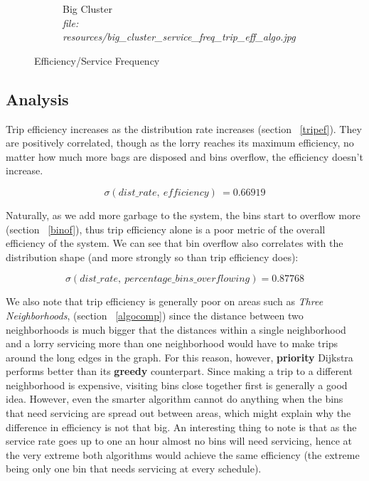 \documentclass{article}
\begin{document}
\begin{figure}[H]
\begin{subfigure}[b]{.5\textwidth}
				\caption{Big Cluster\\\textit{file: resources/big\_cluster\_service\_freq\_trip\_eff\_algo.jpg}}
				\label{fig:fig9b}
			\end{subfigure}
			\label{fig:fig9}
			\caption{Efficiency/Service Frequency}
		\end{figure}

		\subsection{Analysis}
		Trip efficiency increases as the distribution rate increases (section ~\ref{tripef}). They are positively correlated, though
		as the lorry reaches its maximum efficiency, no matter how much more bags are disposed and bins overflow,
		the efficiency doesn't increase.
		
		\begin{equation}
			\sigma(dist\_rate,\ efficiency)\ = 0.66919
		\end{equation} 

		Naturally, as we add more garbage to the system, the bins start to overflow more (section ~\ref{binof}), thus trip efficiency alone
		is a poor metric of the overall efficiency of the system. We can see that bin overflow also correlates with
		the distribution shape (and more strongly so than trip efficiency does):

		\begin{equation}
			\sigma(dist\_rate,\ percentage\_bins\_overflowing) = 0.87768
		\end{equation}

		We also note that trip efficiency is generally poor on areas such as \textit{Three Neighborhoods}, (section ~\ref{algocomp}) since
		the distance between two neighborhoods is much bigger that the distances within a single neighborhood and a lorry servicing
		more than one neighborhood would have to make trips around the long edges in the graph.
		For this reason, however, \textbf{priority} Dijkstra performs better than its \textbf{greedy} counterpart.
		Since making a trip to a different neighborhood is expensive, visiting bins close together first is generally
		a good idea. However, even the smarter algorithm cannot do anything when the bins that need servicing are
		spread out between areas, which might explain why the difference in efficiency is not that big.
		An interesting thing to note is that as the service rate goes up to one an hour almost no bins will need
		servicing, hence at the very extreme both algorithms would achieve the same efficiency (the extreme being only
		one bin that needs servicing at every schedule).
\end{document}
